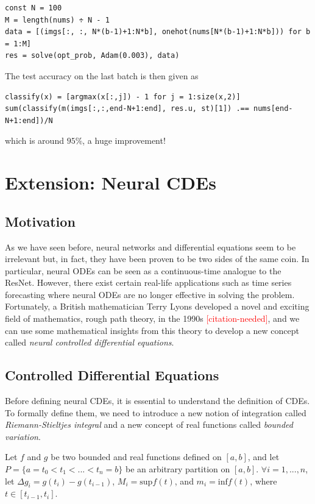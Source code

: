 \documentclass[a4paper,11pt,titlepage]{article}
\newcommand{\citationneeded}{\textcolor{red}{[citation-needed]}}
\theoremstyle{definition}
\theoremstyle{plain}
\theoremstyle{remark}
\begin{document}
\begin{verbatim}
const N = 100
M = length(nums) ÷ N - 1
data = [(imgs[:, :, N*(b-1)+1:N*b], onehot(nums[N*(b-1)+1:N*b])) for b = 1:M]
res = solve(opt_prob, Adam(0.003), data)
\end{verbatim}

The test accuracy on the last batch is then given as

\begin{verbatim}
classify(x) = [argmax(x[:,j]) - 1 for j = 1:size(x,2)]
sum(classify(m(imgs[:,:,end-N+1:end], res.u, st)[1]) .== nums[end-N+1:end])/N
\end{verbatim}

which is around $95\%$, a huge improvement!

\pagebreak
\section{Extension: Neural CDEs}

\subsection{Motivation}

As we have seen before, neural networks and differential equations seem to be irrelevant but, in fact, they have been proven to be two sides of the same coin. In particular, neural ODEs can be seen as a continuous-time analogue to the ResNet. However, there exist certain real-life applications such as time series forecasting where neural ODEs are no longer effective in solving the problem. Fortunately, a British mathematician Terry Lyons developed a novel and exciting field of mathematics, rough path theory, in the 1990s \citationneeded, and we can use some mathematical insights from this theory to develop a new concept called \textit{neural controlled differential equations}.

\subsection{Controlled Differential Equations}

Before defining neural CDEs, it is essential to understand the definition of CDEs. To formally define them, we need to introduce a new notion of integration called \textit{Riemann-Stieltjes integral} and a new concept of real functions called \textit{bounded variation}.

Let $f$ and $g$ be two bounded and real functions defined on $[a,b]$, and let $P=\{a=t_0<t_1<...<t_n=b\}$ be an arbitrary partition on $[a,b]$. $\forall i = 1,...,n$, let $\Delta g_i = g(t_i) - g(t_{i-1})$, $M_i=\mathrm{sup}f(t)$, and $m_i=\mathrm{inf}f(t)$, where $t\in[t_{i-1},t_i]$.
\end{document}
